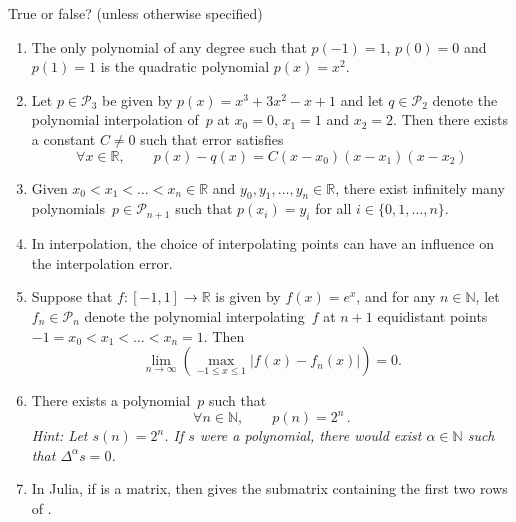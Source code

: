 \documentclass[a4paper]{article}
\begin{document}
\pagestyle{empty}
\thispagestyle{fancy}

True or false? (unless otherwise specified)

\begin{enumerate}

    \item
        The only polynomial of any degree such that $p(-1) = 1$, $p(0) = 0$ and $p(1) = 1$ is the quadratic polynomial $p(x) = x^2$.

    \item
        Let $p \in \mathcal P_3$ be given by $p(x) = x^3 + 3x^2 - x + 1$ and let $q \in \mathcal P_2$ denote the polynomial interpolation of~$p$ at $x_0 = 0$, $x_1 = 1$ and $x_2 = 2$.
        Then there exists a constant $C \neq 0$ such that error satisfies
        \[
            \forall x \in \mathbb R, \qquad
            p(x) - q(x) = C (x-x_0) (x-x_1) (x-x_2)
        \]

    \item
        Given $x_0 < x_1 < \dotsc < x_n \in \mathbb R$
        and $y_0, y_1, \dotsc , y_n \in \mathbb R$,
        there exist infinitely many polynomials~$p \in \mathcal P_{n+1}$ such that $p(x_i) = y_i$ for all $i \in \{0, 1, \dotsc, n\}$.

    \item
        In interpolation, the choice of interpolating points can have an influence on the interpolation error.

    \item
        Suppose that $f \colon [-1, 1] \to \mathbb R$ is given by $f(x) = e^x$,
        and for any $n \in \mathbb N$,
        let $f_n \in \mathcal P_n$ denote the polynomial interpolating~$f$ at $n+1$ equidistant points $-1 = x_0 < x_1 < \dotsc < x_n = 1$.
        Then
        \[
            \lim_{n \to \infty} \left( \max_{-1 \leq x \leq 1} \bigl\lvert f(x) - f_n(x) \bigr\rvert \right) = 0.
        \]

    \item
        There exists a polynomial~$p$ such that
        \[
            \forall n \in \mathbb N, \qquad
            p(n) = 2^n \, .
        \]
        \emph{
            Hint: Let $s(n) = 2^n$. If $s$ were a polynomial,
            there would exist $\alpha \in \mathbb N$ such that $\Delta^{\alpha} s = 0$.
        }

    \item
        In Julia, if  is a matrix,
        then  gives the submatrix containing the first two rows of .


\end{enumerate}
\end{document}
